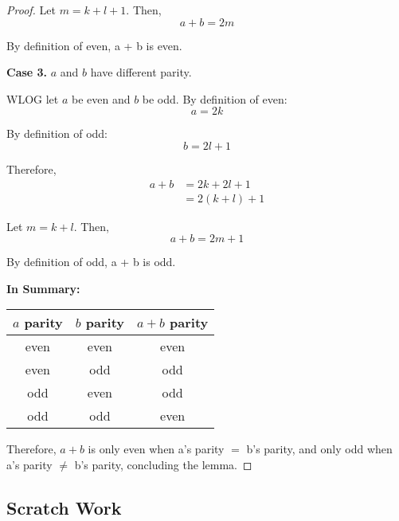 \documentclass{article}
\begin{document}
\begin{proof}
    Let $m = k + l + 1$. Then,
    \begin{equation}
        a + b = 2m
    \end{equation}

    By definition of even, a + b is even.

    \textbf{Case 3.} $a$ and $b$ have different parity. 
    
    WLOG let $a$ be even and $b$ be odd. By definition of even:
    \begin{equation}
        a = 2k
    \end{equation}

    By definition of odd:
    \begin{equation}
        b = 2l + 1
    \end{equation}

    Therefore,
    \begin{equation}
        \begin{aligned}
            a + b &= 2k + 2l + 1 \\
            &= 2(k + l) + 1
        \end{aligned}
    \end{equation}

    Let $m = k + l$. Then,
    \begin{equation}
        a + b = 2m + 1
    \end{equation}

    By definition of odd, a + b is odd.

    \textbf{In Summary:}

    \begin{center}
        \begin{tabular}{c c | c}
            $a$ parity & $b$ parity & $a + b$ parity \\
            \hline
            even & even & even \\ 
            even & odd & odd \\ 
            odd & even & odd \\ 
            odd & odd & even
        \end{tabular}
    \end{center}

    Therefore, $a + b$ is only even when a's parity $=$ b's parity, and only odd when 
    a's parity $\neq$ b's parity, concluding the lemma.
\end{proof}


\begin{landscape}
    \section{Scratch Work}

    \centering
    \thispagestyle{empty}

\end{landscape}

\restoregeometry
    
\end{document}
